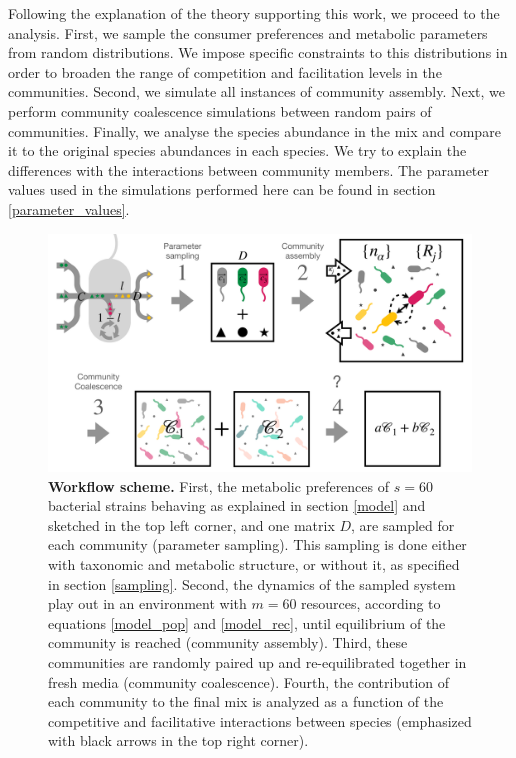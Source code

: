 \documentclass[12pt]{article}
\begin{document}
        Following the explanation of the theory supporting this work, we proceed to the analysis. First, we sample the consumer preferences and metabolic parameters from random distributions. We impose specific constraints to this distributions in order to broaden the range of competition and facilitation levels in the communities. Second, we simulate all instances of community assembly. Next, we perform community coalescence simulations between random pairs of communities. Finally, we analyse the species abundance in the mix and compare it to the original species abundances in each species. We try to explain the differences with the interactions between community members. The parameter values used in the simulations performed here can be found in section \ref{parameter_values}.
        \begin{figure}[t]
            \centering
            \includegraphics[width=\textwidth]{hand_plot_flow.pdf}
            \caption{\textbf{Workflow scheme.} First, the metabolic preferences of $s = 60$ bacterial strains behaving as explained in section \ref{model} and sketched in the top left corner, and one matrix $D$, are sampled for each community (parameter sampling). This sampling is done either with taxonomic and metabolic structure, or without it, as specified in section \ref{sampling}. Second, the dynamics of the sampled system play out in an environment with $m = 60$ resources, according to equations \ref{model_pop} and \ref{model_rec}, until equilibrium of the community is reached (community assembly). Third, these communities are randomly paired up and re-equilibrated together in fresh media (community coalescence). Fourth, the contribution of each community to the final mix is analyzed as a function of the competitive and facilitative interactions between species (emphasized with black arrows in the top right corner).}
            \label{work_flow}
        \end{figure}
        
\end{document}
